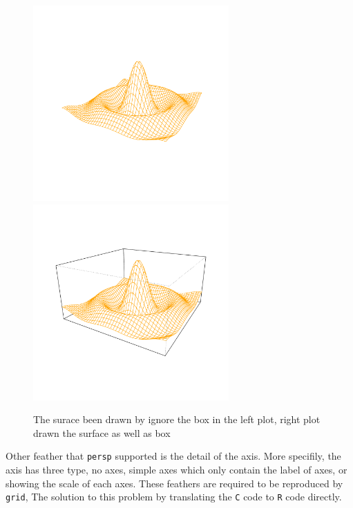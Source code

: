 \documentclass[paper=a4, fontsize=11pt]{report}
\begin{document}
\begin{figure}[h]
\begin{center}
  \includegraphics[height = 7.5cm, width = 7.5cm]{figure/box_example_1.pdf}
  \includegraphics[height = 7.5cm, width = 7.5cm]{figure/box_example_2.pdf}
  \caption{The surace been drawn by ignore the box in the left plot, right plot drawn the surface as well as box}
  	\label{figure8}
\end{center}
\end{figure}

Other feather that \texttt{persp} supported is the detail of the axis. More specifily, the axis has three type, no axes, simple axes which only contain the label of axes, or showing the scale of each axes. These feathers are required to be reproduced by \texttt{grid}, The solution to this problem by translating the \texttt{C} code to \texttt{R} code directly.
\end{document}
